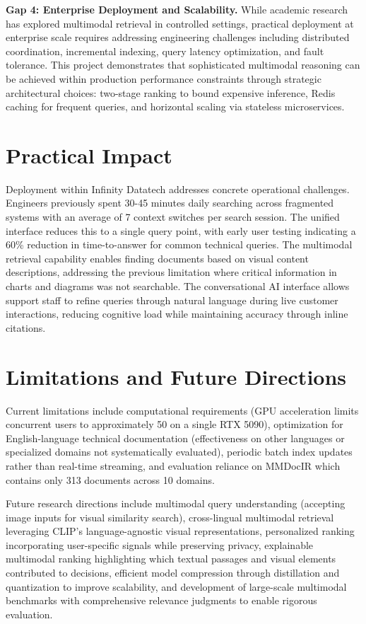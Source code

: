 \textbf{Gap 4: Enterprise Deployment and Scalability.} While academic research has explored multimodal retrieval in controlled settings, practical deployment at enterprise scale requires addressing engineering challenges including distributed coordination, incremental indexing, query latency optimization, and fault tolerance. This project demonstrates that sophisticated multimodal reasoning can be achieved within production performance constraints through strategic architectural choices: two-stage ranking to bound expensive inference, Redis caching for frequent queries, and horizontal scaling via stateless microservices.

\section{Practical Impact}

Deployment within Infinity Datatech addresses concrete operational challenges. Engineers previously spent 30-45 minutes daily searching across fragmented systems with an average of 7 context switches per search session. The unified interface reduces this to a single query point, with early user testing indicating a 60\% reduction in time-to-answer for common technical queries. The multimodal retrieval capability enables finding documents based on visual content descriptions, addressing the previous limitation where critical information in charts and diagrams was not searchable. The conversational AI interface allows support staff to refine queries through natural language during live customer interactions, reducing cognitive load while maintaining accuracy through inline citations.

\section{Limitations and Future Directions}

Current limitations include computational requirements (GPU acceleration limits concurrent users to approximately 50 on a single RTX 5090), optimization for English-language technical documentation (effectiveness on other languages or specialized domains not systematically evaluated), periodic batch index updates rather than real-time streaming, and evaluation reliance on MMDocIR which contains only 313 documents across 10 domains.

Future research directions include multimodal query understanding (accepting image inputs for visual similarity search), cross-lingual multimodal retrieval leveraging CLIP's language-agnostic visual representations, personalized ranking incorporating user-specific signals while preserving privacy, explainable multimodal ranking highlighting which textual passages and visual elements contributed to decisions, efficient model compression through distillation and quantization to improve scalability, and development of large-scale multimodal benchmarks with comprehensive relevance judgments to enable rigorous evaluation.


